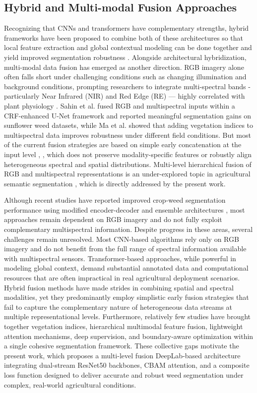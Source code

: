 \documentclass[pdflatex,sn-mathphys-num]{sn-jnl}
\begin{document}
\subsection{Hybrid and Multi-modal Fusion Approaches}
Recognizing that CNNs and transformers have complementary strengths, hybrid frameworks have been proposed to combine both of these architectures so that local feature extraction and global contextual modeling can be done together and yield improved segmentation robustness \cite{zhou2018unet++}. Alongside architectural hybridization, multi-modal data fusion has emerged as another direction. RGB imagery alone often falls short under challenging conditions such as changing illumination and background conditions, prompting researchers to integrate multi-spectral bands - particularly Near Infrared (NIR) and Red Edge (RE) — highly correlated with plant physiology \cite{zhang2021multispectral}. Sahin et al. \cite{sahin2023segmentation} fused RGB and multispectral inputs within a CRF-enhanced U-Net framework and reported meaningful segmentation gains on sunflower weed datasets, while Ma et al. \cite{ma2024vegetation_dl} showed that adding vegetation indices to multispectral data improves robustness under different field conditions. But most of the current fusion strategies are based on simple early concatenation at the input level \cite{li2022attention_agriculture}, \cite{yang2025rshrnet}, which does not preserve modality-specific features or robustly align heterogeneous spectral and spatial distributions. Multi-level hierarchical fusion of RGB and multispectral representations is an under-explored topic in agricultural semantic segmentation \cite{li2023weed}, which is directly addressed by the present work. 


Although recent studies have reported improved crop-weed segmentation performance using modified encoder-decoder and ensemble architectures \cite{ganapathy2025cropweed}, most approaches remain dependent on RGB imagery and do not fully exploit complementary multispectral information. Despite progress in these areas, several challenges remain unresolved. Most CNN-based algorithms rely only on RGB imagery and do not benefit from the full range of spectral information available with multispectral sensors. Transformer-based approaches, while powerful in modeling global context, demand substantial annotated data and computational resources that are often impractical in real agricultural deployment scenarios. Hybrid fusion methods have made strides in combining spatial and spectral modalities, yet they predominantly employ simplistic early fusion strategies that fail to capture the complementary nature of heterogeneous data streams at multiple representational levels. Furthermore, relatively few studies have brought together vegetation indices, hierarchical multimodal feature fusion, lightweight attention mechanisms, deep supervision, and boundary-aware optimization within a single cohesive segmentation framework. These collective gaps motivate the present work, which proposes a multi-level fusion DeepLab-based architecture integrating dual-stream ResNet50 backbones, CBAM attention, and a composite loss function designed to deliver accurate and robust weed segmentation under complex, real-world agricultural conditions.
\end{document}

